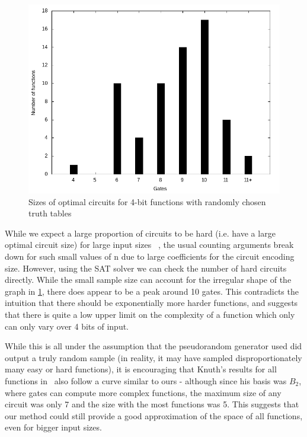 \documentclass{article}
\begin{document}
\begin{figure}[!h]
  \includegraphics[width=\textwidth]{images/random/4bit_sizes.png}
  \caption{Sizes of optimal circuits for 4-bit functions with randomly chosen truth tables}
  \label{fig:4rand_sizes}
\end{figure}

While we expect a large proportion of circuits to be hard (i.e. have a large optimal circuit size) for large input sizes ~\cite{arora}, the usual counting arguments break down for such small values of n due to large coefficients for the circuit encoding size. However, using the SAT solver we can check the number of hard circuits directly. While the small sample size can account for the irregular shape of the graph in \ref{fig:4rand_sizes}, there does appear to be a peak around 10 gates. This contradicts the intuition that there should be exponentially more harder functions, and suggests that there is quite a low upper limit on the complexity of a function which only can only vary over 4 bits of input. 

While this is all under the assumption that the pseudorandom generator used did output a truly random sample (in reality, it may have sampled disproportionately many easy or hard functions), it is encouraging that Knuth's results for all functions in~\cite{knuth15} also follow a curve similar to ours - although since his basis was $B_2$, where gates can compute more complex functions, the maximum size of any circuit was only 7 and the size with the most functions was 5. This suggests that our method could still provide a good approximation of the space of all functions, even for bigger input sizes.
\end{document}
